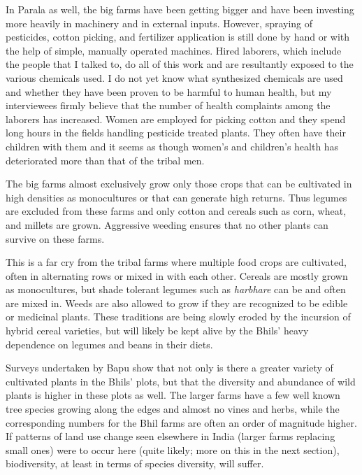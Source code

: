 \documentclass[report.tex]{subfiles}
\begin{document}
In Parala as well, the big farms have been getting bigger and have been investing more heavily in machinery and in external inputs. However, spraying of pesticides, cotton picking, and fertilizer application is still done by hand or with the help of simple, manually operated machines. Hired laborers, which include the people that I talked to, do all of this work and are resultantly exposed to the various chemicals used. I do not yet know what synthesized chemicals are used and whether they have been proven to be harmful to human health, but my interviewees firmly believe that the number of health complaints among the laborers has increased. Women are employed for picking cotton and they spend long hours in the fields handling pesticide treated plants. They often have their children with them and it seems as though women's and children's health has deteriorated more than that of the tribal men.

The big farms almost exclusively grow only those crops that can be cultivated in high densities as monocultures or that can generate high returns. Thus legumes are excluded from these farms and only cotton and cereals such as corn, wheat, and millets are grown. Aggressive weeding ensures that no other plants can survive on these farms.

This is a far cry from the tribal farms where multiple food crops are cultivated, often in alternating rows or mixed in with each other. Cereals are mostly grown as monocultures, but shade tolerant legumes such as \textit{harbhare} can be and often are mixed in. Weeds are also allowed to grow if they are recognized to be edible or medicinal plants. These traditions are being slowly eroded by the incursion of hybrid cereal varieties, but will likely be kept alive by the Bhils' heavy dependence on legumes and beans in their diets.

Surveys undertaken by Bapu show that not only is there a greater variety of cultivated plants in the Bhils' plots, but that the diversity and abundance of wild plants is higher in these plots as well. The larger farms have a few well known tree species growing along the edges and almost no vines and herbs, while the corresponding numbers for the Bhil farms are often an order of magnitude higher. If patterns of land use change seen elsewhere in India (larger farms replacing small ones) were to occur here (quite likely; more on this in the next section), biodiversity, at least in terms of species diversity, will suffer.
\end{document}
